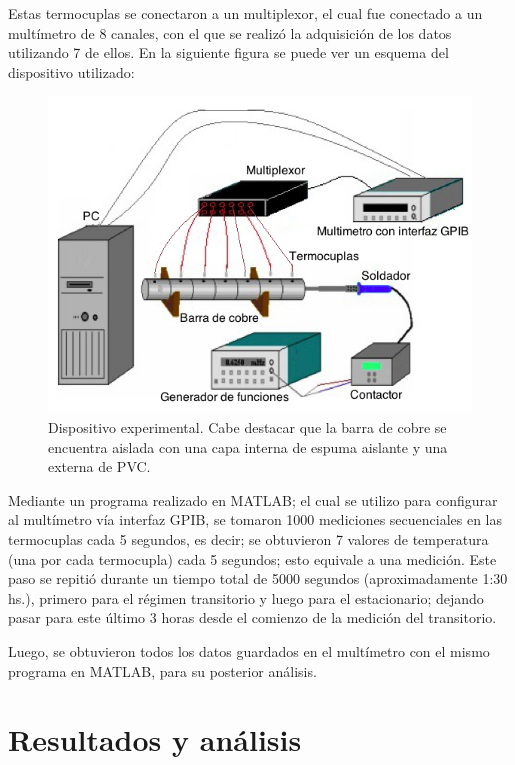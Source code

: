 \documentclass[twoside,twocolumn,a4paper]{article}
\begin{document}
Estas termocuplas se conectaron a un multiplexor, el cual fue conectado a un mult\'imetro de 8 canales, con el que se realiz\'o la adquisici\'on de los datos utilizando 7 de ellos. En la siguiente figura se puede ver un esquema del dispositivo utilizado:

\begin{figure}[H]
\includegraphics[width=\linewidth]{dispexp.jpg}
\caption{Dispositivo experimental. Cabe destacar que la barra de cobre se encuentra aislada con una capa interna de espuma aislante y una externa de PVC.}
\label{fig:disenoestatico}
\end{figure}

Mediante un programa realizado en MATLAB; el cual se utilizo para configurar al mult\'imetro v\'ia interfaz GPIB, se tomaron 1000 mediciones secuenciales en las termocuplas cada 5 segundos, es decir; se obtuvieron 7 valores de temperatura (una por cada termocupla) cada 5 segundos; esto equivale a una medici\'on. Este paso se repiti\'o durante un tiempo total de 5000 segundos (aproximadamente 1:30 hs.), primero para el r\'egimen transitorio y luego para el estacionario; dejando pasar para este \'ultimo 3 horas desde el comienzo de la medici\'on del transitorio. \newline

\par
Luego, se obtuvieron todos los datos guardados en el mult\'imetro con el mismo programa en MATLAB, para su posterior an\'alisis.

\section{Resultados y an\'alisis}
\end{document}
